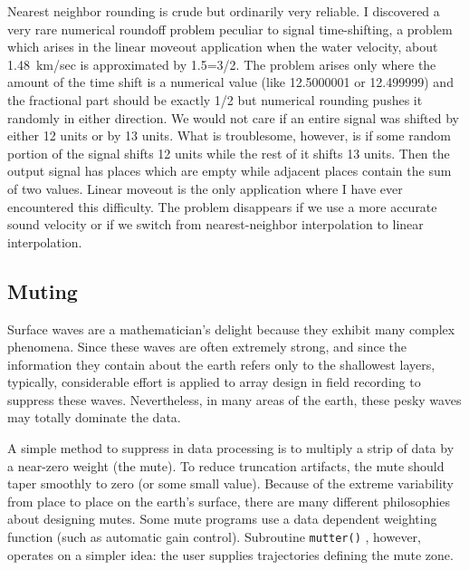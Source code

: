\par
Nearest neighbor rounding is crude but ordinarily very reliable.
I discovered a very rare numerical roundoff problem
peculiar to signal time-shifting, a problem
which arises in the linear moveout application
when the water velocity, about 1.48~km/sec is approximated by 1.5=3/2.
The problem arises only where the amount of the time shift
is a numerical value (like 12.5000001 or 12.499999)
and the fractional part should be exactly 1/2 but
numerical rounding pushes it randomly in either direction.
We would not care if an entire signal was shifted
by either 12 units or by 13 units.
What is troublesome, however, is if some random portion
of the signal shifts 12 units while the rest of it shifts 13 units.
Then the output signal has places which are empty while
adjacent places contain the sum of two values.
Linear moveout is the only application
where I have ever encountered this difficulty.
The problem disappears if we use a more accurate sound velocity
or if we switch from nearest-neighbor interpolation
to linear interpolation.

\subsection{Muting}
Surface waves are a mathematician's delight
because they exhibit many complex phenomena.
Since these waves are often extremely strong,
and since the information they contain about the earth
refers only to the shallowest layers,
typically,
considerable effort is applied to array design in field recording
to suppress these waves.
Nevertheless, in many areas of the earth,
these pesky waves may totally dominate the data.

\par
A simple method to suppress  in data processing
is to multiply a strip of data by a near-zero weight (the mute).
To reduce truncation artifacts,
the mute should taper smoothly to zero (or some small value).
Because of the extreme variability from place to place
on the earth's surface,
there are many different philosophies
about designing mutes.
Some mute programs use a data dependent weighting function
(such as automatic gain control).
Subroutine \texttt{mutter()} ,
however, operates on a simpler idea: 
the user supplies trajectories defining the mute zone.

